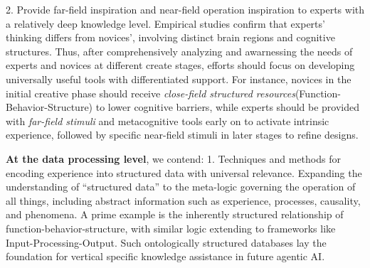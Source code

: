 2. Provide far-field inspiration and near-field operation inspiration to experts with a relatively deep knowledge level. Empirical studies confirm that experts' thinking differs from novices'\cite{chai2015behavioral, chen2024toward}, involving distinct brain regions and cognitive structures\cite{goucher2019neuroimaging}. Thus, after comprehensively analyzing and awarnessing the needs of experts and novices at different create stages, efforts should focus on developing universally useful tools with differentiated support. For instance, novices in the initial creative phase should receive \textit{close-field structured resources}(Function-Behavior-Structure) to lower cognitive barriers, while experts should be provided with \textit{far-field stimuli} and metacognitive tools\cite{ball2019advancing, viswanathan2016study} early on to activate intrinsic experience, followed by specific near-field stimuli in later stages to refine designs.



\textbf{At the data processing level}, we contend: 
1. Techniques and methods for encoding experience into structured data with universal relevance. Expanding the understanding of ``structured data'' to the meta-logic governing the operation of all things, including abstract information such as experience, processes, causality, and phenomena\cite{bandemer2012fuzzy}. A prime example is the inherently structured relationship of function-behavior-structure\cite{chen2024toward}, with similar logic extending to frameworks like Input-Processing-Output\cite{boell2012conceptualizing}. Such ontologically structured databases lay the foundation for vertical specific knowledge assistance in future agentic AI\cite{acharya2025agentic}.  

